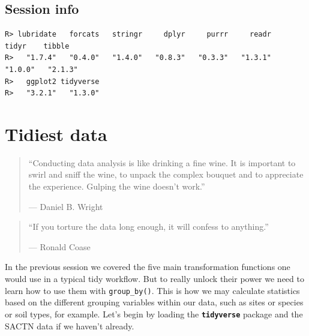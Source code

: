 \documentclass[
]{book}
\newenvironment{Shaded}{\begin{snugshade}}{\end{snugshade}}
\newcommand{\KeywordTok}[1]{\textcolor[rgb]{0.13,0.29,0.53}{\textbf{#1}}}
\newcommand{\NormalTok}[1]{#1}
\newcommand{\OperatorTok}[1]{\textcolor[rgb]{0.81,0.36,0.00}{\textbf{#1}}}
\newcommand{\StringTok}[1]{\textcolor[rgb]{0.31,0.60,0.02}{#1}}
\begin{document}
\hypertarget{session-info-10}{%
\section{Session info}\label{session-info-10}}

\begin{Shaded}
\end{Shaded}

\begin{verbatim}
R> lubridate   forcats   stringr     dplyr     purrr     readr     tidyr    tibble 
R>   "1.7.4"   "0.4.0"   "1.4.0"   "0.8.3"   "0.3.3"   "1.3.1"   "1.0.0"   "2.1.3" 
R>   ggplot2 tidyverse 
R>   "3.2.1"   "1.3.0"
\end{verbatim}

\hypertarget{tidiest}{%
\chapter{Tidiest data}\label{tidiest}}

\begin{quote}
``Conducting data analysis is like drinking a fine wine. It is important to swirl and sniff the wine, to unpack the complex bouquet and to appreciate the experience. Gulping the wine doesn't work.''

--- Daniel B. Wright
\end{quote}

\begin{quote}
``If you torture the data long enough, it will confess to anything.''

--- Ronald Coase
\end{quote}

In the previous session we covered the five main transformation functions one would use in a typical tidy workflow. But to really unlock their power we need to learn how to use them with \texttt{group\_by()}. This is how we may calculate statistics based on the different grouping variables within our data, such as sites or species or soil types, for example. Let's begin by loading the \textbf{\texttt{tidyverse}} package and the SACTN data if we haven't already.
\end{document}
